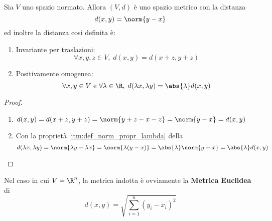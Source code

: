 \begin{proposition}
	\label{prop:dist_sp_norm}
	Sia $V$ uno spazio normato. Allora $(V,d)$ è uno spazio metrico con la distanza
	\[d(x,y) = \norm{y-x}\]
	ed inoltre la distanza così definita è:
	\begin{enumerate}
		\item Invariante per traslazioni:
			\[\forall x,y,z \in V,\; d(x,y) = d(x+z, y+z)\]
		\item Positivamente omogenea:
			\[\forall x,y \in V \text{ e } \forall \lambda \in \R,\; d(\lambda x, \lambda y) = \abs{\lambda}d(x,y)\]
	\end{enumerate}
	\begin{proof}
		~
		\begin{enumerate}
			\item $d(x,y) = d(x+z, y+z) = \norm{y+z-x-z} = \norm{y-x} = d(x,y)$
			\item Con la proprietà \ref{itm:def_norm_propr_lambda} della 
				\[d(\lambda x, \lambda y) = \norm{\lambda y - \lambda x} = \norm{\lambda (y - x)} = \abs{\lambda} \norm{y - x} = \abs{\lambda}d(x,y)\]
		\end{enumerate}
	\end{proof}
	\begin{note}
		Nel caso in cui $V = \R^n$, la metrica indotta è ovviamente la \textbf{Metrica Euclidea} di \hyperref[ex:dist_eucl]{}
		\[d(x,y) = \sqrt{\sum\limits_{i=1}^{n} (y_i-x_i)^2 }\]
	\end{note}
\end{proposition}

